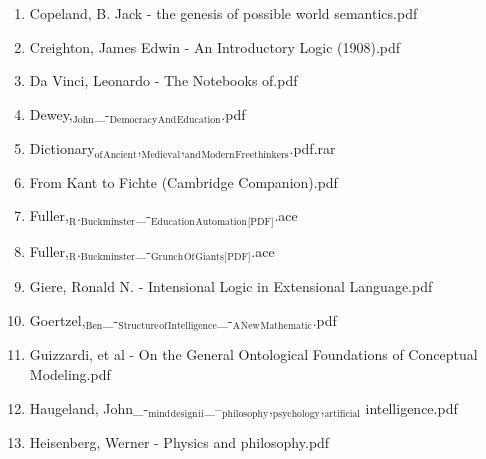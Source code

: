 \documentclass[11pt]{article}
\begin{document}
\begin{enumerate}
\begin{enumerate}
\begin{enumerate}
\begin{enumerate}
\begin{enumerate}
\begin{enumerate}
\item Copeland, B. Jack - the genesis of possible world semantics.pdf
\label{sec-1-1-1-1-7-3-39-13-6}

\item Creighton, James Edwin  - An Introductory Logic (1908).pdf
\label{sec-1-1-1-1-7-3-39-13-7}

\item Da Vinci, Leonardo - The Notebooks of.pdf
\label{sec-1-1-1-1-7-3-39-13-8}

\item Dewey,$_{\text{John}}$\_-$_{\text{Democracy}}$$_{\text{And}}$$_{\text{Education}}$.pdf
\label{sec-1-1-1-1-7-3-39-13-9}

\item Dictionary$_{\text{of}}$$_{\text{Ancient}}$,$_{\text{Medieval}}$,$_{\text{and}}$$_{\text{Modern}}$$_{\text{Freethinkers}}$.pdf.rar
\label{sec-1-1-1-1-7-3-39-13-10}

\item From Kant to Fichte (Cambridge Companion).pdf
\label{sec-1-1-1-1-7-3-39-13-11}

\item Fuller,$_{\text{R}}$.$_{\text{Buckminster}}$\_-$_{\text{Education}}$$_{\text{Automation}}$$_{\text{[PDF]}}$.ace
\label{sec-1-1-1-1-7-3-39-13-12}

\item Fuller,$_{\text{R}}$.$_{\text{Buckminster}}$\_-$_{\text{Grunch}}$$_{\text{Of}}$$_{\text{Giants}}$$_{\text{[PDF]}}$.ace
\label{sec-1-1-1-1-7-3-39-13-13}

\item Giere, Ronald N. - Intensional Logic in Extensional Language.pdf
\label{sec-1-1-1-1-7-3-39-13-14}

\item Goertzel,$_{\text{Ben}}$\_-$_{\text{Structure}}$$_{\text{of}}$$_{\text{Intelligence}}$\_-$_{\text{A}}$$_{\text{New}}$$_{\text{Mathematic}}$.pdf
\label{sec-1-1-1-1-7-3-39-13-15}

\item Guizzardi, et al - On the General Ontological Foundations of Conceptual Modeling.pdf
\label{sec-1-1-1-1-7-3-39-13-16}

\item Haugeland, John\_-$_{\text{mind}}$$_{\text{design}}$$_{\text{ii}}$\_--$_{\text{philosophy}}$,$_{\text{psychology}}$,$_{\text{artificial}}$ intelligence.pdf
\label{sec-1-1-1-1-7-3-39-13-17}

\item Heisenberg, Werner - Physics and philosophy.pdf
\label{sec-1-1-1-1-7-3-39-13-18}


\end{enumerate}
\end{enumerate}
\end{enumerate}
\end{enumerate}
\end{enumerate}
\end{enumerate}
\end{document}
